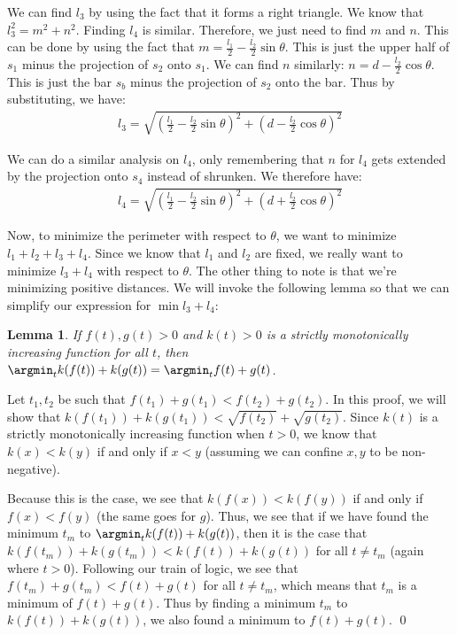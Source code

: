 \documentclass[12pt]{amsart}   %
\newtheorem{lemma}[theorem]{Lemma}
\begin{document}
We can find $l_3$ by using the fact that it forms a right triangle. We know that $l_3^2 = m^2 + n^2$. Finding $l_4$ is similar. Therefore, we just need to find $m$ and $n$. This can be done by using the fact that $m = \frac{l_1}{2} - \frac{l_2}{2} \sin \theta$. This is just the upper half of $s_1$ minus the projection of $s_2$ onto $s_1$. We can find $n$ similarly: $n = d - \frac{l_2}{2} \cos \theta$. This is just the bar $s_b$ minus the projection of $s_2$ onto the bar. Thus by substituting, we have:
\begin{eqnarray}
  l_3 = \sqrt{ \left(\frac{l_1}{2} - \frac{l_2}{2} \sin \theta \right)^2 + \left( d - \frac{l_2}{2} \cos \theta \right)^2 }
\end{eqnarray}

We can do a similar analysis on $l_4$, only remembering that $n$ for $l_4$ gets extended by the projection onto $s_4$ instead of shrunken. We therefore have:
\begin{eqnarray}
  l_4 = \sqrt{ \left(\frac{l_1}{2} - \frac{l_2}{2} \sin \theta \right)^2 + \left( d + \frac{l_2}{2} \cos \theta \right)^2 }
\end{eqnarray}

Now, to minimize the perimeter with respect to $\theta$, we want to minimize $l_1 + l_2 + l_3 + l_4$. Since we know that $l_1$ and $l_2$ are fixed, we really want to minimize $l_3 + l_4$ with respect to $\theta$. The other thing to note is that we're minimizing positive distances. We will invoke the following lemma so that we can simplify our expression for $\min l_3 + l_4$:

\begin{lemma}
  If $f(t), g(t) > 0$ and $k(t) > 0$ is a strictly monotonically increasing function for all $t$, then $\argmin_t k(f(t)) + k(g(t)) = \argmin_t f(t) + g(t)$.
  \label{lemma:minsqrt}
\end{lemma}
\proof Let $t_1, t_2$ be such that $f(t_1) + g(t_1) < f(t_2) + g(t_2)$. In this proof, we will show that $k(f(t_1)) + k(g(t_1)) < \sqrt{f(t_2)} + \sqrt{g(t_2)}$. Since $k(t)$ is a strictly monotonically increasing function when $t > 0$, we know that $k(x) < k(y)$ if and only if $x < y$ (assuming we can confine $x, y$ to be non-negative).

Because this is the case, we see that $k(f(x)) < k(f(y))$ if and only if $f(x) < f(y)$ (the same goes for $g$). Thus, we see that if we have found the minimum $t_m$ to $\argmin_t k(f(t)) + k(g(t))$, then it is the case that $k(f(t_m)) + k(g(t_m)) < k(f(t)) + k(g(t))$ for all $t \neq t_m$ (again where $t > 0$). Following our train of logic, we see that $f(t_m) + g(t_m) < f(t) + g(t)$ for all $t \neq t_m$, which means that $t_m$ is a minimum of $f(t) + g(t)$. Thus by finding a minimum $t_m$ to $k(f(t)) + k(g(t))$, we also found a minimum to $f(t) + g(t)$. \qed
\end{document}
